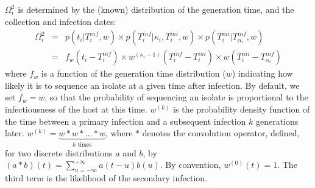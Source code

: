 \documentclass[10pt]{article}
\begin{document}
$\Omega_i^2$ is determined by the (known) distribution of the generation time, and the collection and infection dates:
\begin{eqnarray}
 \Omega_i^2 & = & p(t_i | T_i^{inf}, w) \times p(T_i^{inf}| \kappa_i,T_i^{ini}, w) \times p(T_i^{ini}| T_{\alpha_i}^{inf}, w) \nonumber \\
& = &  f_w(t_i - T_i^{inf}) \times  w^{\left(\kappa_i-1\right)}(T_i^{inf} - T_i^{ini}) \times w(T_i^{ini} - T_{\alpha_i}^{inf})
\end{eqnarray}
where $f_w$ is a function of the generation time distribution ($w$) indicating how likely it is to sequence an isolate at a given time after infection.
By default, we set $f_w=w$, so that the probability of sequencing an isolate is proportional to the infectiousness of the host at this time.
$w^{\left(k\right)}$ is the probability density function of the time between a primary infection and a subsequent infection $k$ generations later.
$w^{\left(k\right)} = \underbrace{w*w*\ldots*w}_{k \text{ times}} $, where $*$ denotes the convolution operator, defined, for two discrete distributions $a$ and $b$, by $\left(a*b\right)\left(t\right) = \sum_{u=-\infty}^{+\infty} a\left(t-u\right)b\left(u\right)$. By convention, $w^{\left(0\right)}\left(t\right) = 1$.
The third term is the likelihood of the secondary infection.
\\
\end{document}
